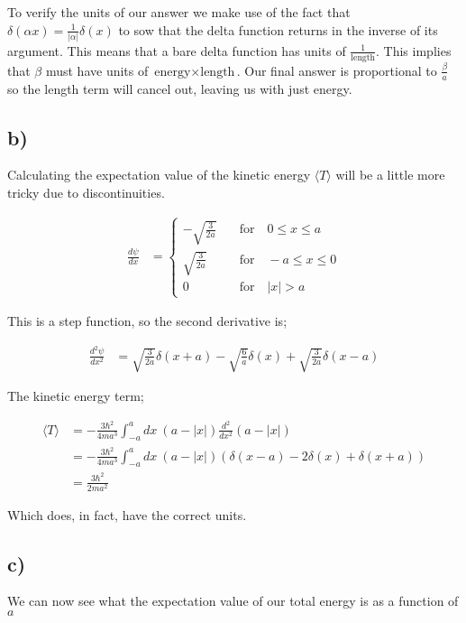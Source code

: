 \documentclass{article}
\newcommand{\p}[1]{\left(#1\right)}
\newcommand{\braket}[1]{\langle#1\rangle}
\begin{document}
To verify the units of our answer we make use of the fact that $\delta\p{\alpha{x}}=\frac{1}{|\alpha|}\delta\p{x}$ to sow that the delta function returns in the inverse of its argument. This means that a bare delta function has units of $\frac{1}{\text{length}}$. This implies that $\beta$ must have units of $\text{energy}\times\text{length}$. Our final answer is proportional to $\frac{\beta}{a}$ so the length term will cancel out, leaving us with just energy.

\subsection*{b)}
Calculating the expectation value of the kinetic energy $\braket{T}$ will be a little more tricky due to discontinuities.

\begin{align*}
    \frac{d\psi}{dx}&=\begin{cases}
    -\sqrt{\frac{3}{2a}}\quad& \text{for}\quad 0\leq{x}\leq{a}\\[1em]
    \sqrt{\frac{3}{2a}}\quad& \text{for}\quad -a\leq{x}\leq{0}\\[1em]
    0\quad & \text{for} \quad |x|> a
    \end{cases}
\end{align*}



This is a step function, so the second derivative is;

\begin{align*}
    \frac{d^2\psi}{dx^2}&=\sqrt{\frac{3}{2a}}\delta(x+a)-\sqrt{\frac{6}{a}}\delta(x)+\sqrt{\frac{3}{2a}}\delta(x-a)
\end{align*}

The kinetic energy term;

\begin{align*}
    \braket{T}&=-\frac{3\hbar^2}{4ma^3}\int_{-a}^{a}dx\:(a-|x|)\frac{d^2}{dx^2}(a-|x|)\\[1em]
    &=-\frac{3\hbar^2}{4ma^3}\int_{-a}^{a}dx\:(a-|x|)\p{\delta(x-a)-2\delta(x)+\delta(x+a)}\\[1em]
    &=\frac{3\hbar^2}{2ma^2}
\end{align*}

Which does, in fact, have the correct units.

\subsection*{c)}
We can now see what the expectation value of our total energy is as a function of $a$
\end{document}
